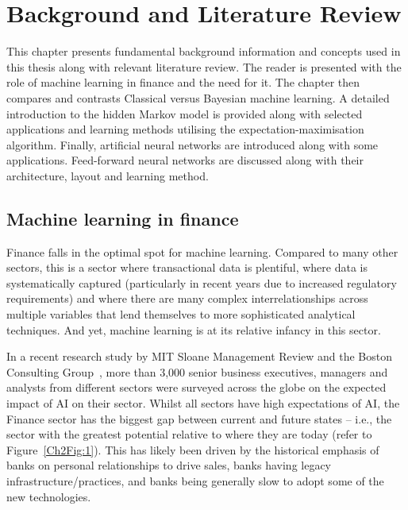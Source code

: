 \chapter{Background and Literature Review}

\begin{singlespacing}
\begin{microabstract}
    This chapter presents fundamental background information and concepts used in this thesis along with relevant literature review. The reader is presented with the role of machine learning in finance and the need for it. The chapter then compares and contrasts Classical versus Bayesian machine learning. A detailed introduction to the hidden Markov model is provided along with selected applications and learning methods utilising the expectation-maximisation algorithm. Finally, artificial neural networks are introduced along with some applications. Feed-forward neural networks are discussed along with their architecture, layout and learning method.
\end{microabstract}
\end{singlespacing} 

\section{Machine learning in finance}\label{Ch2Sec1}

Finance falls in the optimal spot for machine learning. Compared to many other sectors, this is a sector where transactional data is plentiful, where data is systematically captured (particularly in recent years due to increased regulatory requirements) and where there are many complex interrelationships across multiple variables that lend themselves to more sophisticated analytical techniques. And yet, machine learning is at its relative infancy in this sector.

In a recent research study by MIT Sloane Management Review and the Boston Consulting Group~\autocite{ransbotham2017reshaping}, more than 3,000 senior business executives, managers and analysts from different sectors were surveyed across the globe on the expected impact of AI on their sector. Whilst all sectors have high expectations of AI, the Finance sector has the biggest gap between current and future states -- i.e., the sector with the greatest potential relative to where they are today (refer to Figure~\ref{Ch2Fig:1}). This has likely been driven by the historical emphasis of banks on personal relationships to drive sales, banks having legacy infrastructure/practices, and banks being generally slow to adopt some of the new technologies.


